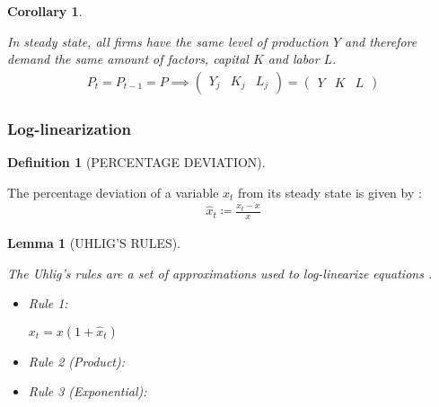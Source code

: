 \documentclass[
	12pt,
	]{article}
\numberwithin{equation}{section}
\theoremstyle{definition}
\newtheorem{definition}{Definition}[section]
\theoremstyle{plain}
\theoremstyle{plain}
\newtheorem{lemma}{Lemma}[section]
\theoremstyle{plain}
\newtheorem{corollary}{Corollary}[lemma]
\begin{document}
\begin{corollary}\label{coro:steady-state-YKL}
	
	In steady state, all firms have the same level of production $Y$ and therefore demand the same amount of factors, capital $K$ and labor $L$.
	\begin{align*}
		P_t = P_{t-1} = P \implies 
		\begin{pmatrix}
			Y_j & K_j & L_j
		\end{pmatrix} =
		\begin{pmatrix}
			Y & K & L
		\end{pmatrix}
	\end{align*}
	
\end{corollary}


\subsubsection{Log-linearization}


\begin{definition}[PERCENTAGE DEVIATION]\label{def:percentage-deviation}
	
	The percentage deviation of a variable $x_t$ from its steady state is given by \cite[Lecture 6, p.2]{solis-garcia_ucb_2022}:
	\begin{align}
		\hat{x}_t \coloneq \frac{x_t - x}{x} \label{eq:percentage-deviation}
	\end{align}
		
\end{definition}


\begin{lemma}[UHLIG'S RULES]\label{lemma:uhligs-rules}
	
	The Uhlig's rules are a set of approximations used to log-linearize equations \cite[Lecture 6, p.2]{solis-garcia_ucb_2022}.
	
	\begin{itemize}
		\item Rule 1: \label{uhlig-rule-1}
		
		\( x_t = x(1 + \hat{x}_t) \) 
		
		\item Rule 2 (Product):
		
		
		
		\item Rule 3 (Exponential):
		
		
	\end{itemize}

\end{lemma}
\end{document}
